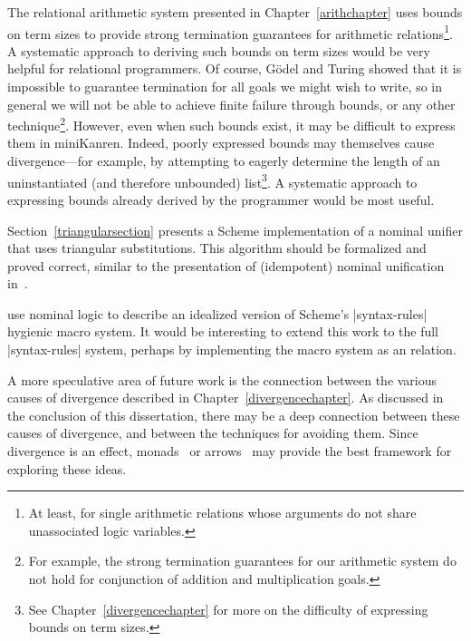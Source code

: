 
The relational arithmetic system presented in
Chapter~\ref{arithchapter} uses bounds on term sizes to provide strong
termination guarantees for arithmetic relations\footnote{At least, for
  single arithmetic relations whose arguments do not share
  unassociated logic variables.}.  A systematic approach to deriving
such bounds on term sizes would be very helpful for relational
programmers.  Of course, G\"{o}del and Turing showed that it is
impossible to guarantee termination for all goals we might wish to
write, so in general we will not be able to achieve finite failure
through bounds, or any other technique\footnote{For example, the
  strong termination guarantees for our arithmetic system do not hold
  for conjunction of addition and multiplication goals.}.  However,
even when such bounds exist, it may be difficult to express them in
miniKanren.  Indeed, poorly expressed bounds may themselves cause
divergence---for example, by attempting to eagerly determine the
length of an uninstantiated (and therefore unbounded)
list\footnote{See Chapter~\ref{divergencechapter} for more on the
  difficulty of expressing bounds on term sizes.}.  A systematic
approach to expressing bounds already derived by the programmer would
be most useful.

Section~\ref{triangularsection} presents a Scheme implementation of a
nominal unifier that uses triangular substitutions.  This algorithm
should be formalized and proved correct, similar to the presentation
of (idempotent) nominal unification in~\citet{Urban-Pitts-Gabbay/04}.

\citet{HermanWand08:Hygiene} use nominal logic to describe an
idealized version of Scheme's \scheme|syntax-rules| hygienic macro
system.  It would be interesting to extend this work to the full
\scheme|syntax-rules| system, perhaps by implementing the macro system
as an \alphakanrensp relation.

A more speculative area of future work is the connection between the
various causes of divergence described in
Chapter~\ref{divergencechapter}.  As discussed in the conclusion of
this dissertation, there may be a deep connection between these causes
of divergence, and between the techniques for avoiding them.  Since
divergence is an effect, monads~\cite{moggi91notions} or
arrows~\cite{hughes98generalisingmonads} may provide the best
framework for exploring these ideas.

